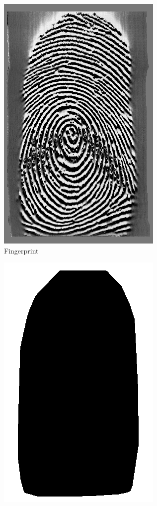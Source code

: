 \documentclass[presentation]{beamer}
\begin{document}
\begin{frame}
	\begin{figure}
		\centering
		\begin{subfigure}[t]{0.45\linewidth}
			\centering
			\includegraphics[width=0.7\linewidth]{Thresholding/Fingerprint}
			\caption{Fingerprint}
		\end{subfigure}
		\hfill
		\begin{subfigure}[t]{0.45\linewidth}
			\centering
			\includegraphics[width=0.7\linewidth]{Thresholding/ROI}

\end{subfigure}
\end{figure}
\end{frame}
\end{document}
